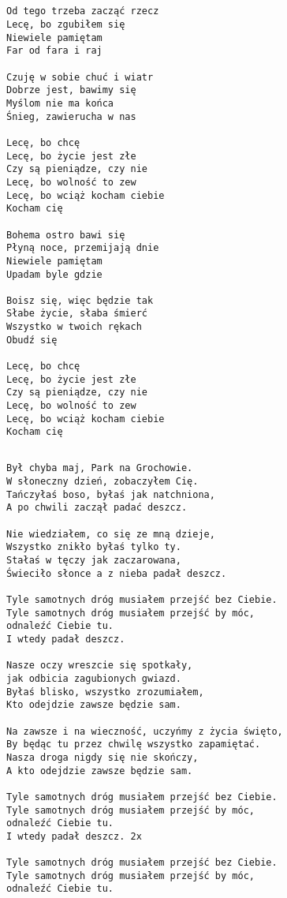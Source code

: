 \documentclass[12pt]{article}
\begin{document}
\subsection*{}
\begin{verbatim}
Od tego trzeba zacząć rzecz
Lecę, bo zgubiłem się
Niewiele pamiętam
Far od fara i raj

Czuję w sobie chuć i wiatr
Dobrze jest, bawimy się
Myślom nie ma końca
Śnieg, zawierucha w nas

Lecę, bo chcę
Lecę, bo życie jest złe
Czy są pieniądze, czy nie
Lecę, bo wolność to zew
Lecę, bo wciąż kocham ciebie
Kocham cię

Bohema ostro bawi się
Płyną noce, przemijają dnie
Niewiele pamiętam
Upadam byle gdzie

Boisz się, więc będzie tak
Słabe życie, słaba śmierć
Wszystko w twoich rękach
Obudź się

Lecę, bo chcę
Lecę, bo życie jest złe
Czy są pieniądze, czy nie
Lecę, bo wolność to zew
Lecę, bo wciąż kocham ciebie
Kocham cię
\end{verbatim}
\clearpage

\subsection*{}
\begin{verbatim}
Był chyba maj, Park na Grochowie.
W słoneczny dzień, zobaczyłem Cię.
Tańczyłaś boso, byłaś jak natchniona,
A po chwili zaczął padać deszcz.

Nie wiedziałem, co się ze mną dzieje,
Wszystko znikło byłaś tylko ty.
Stałaś w tęczy jak zaczarowana,
Świeciło słonce a z nieba padał deszcz.

Tyle samotnych dróg musiałem przejść bez Ciebie.
Tyle samotnych dróg musiałem przejść by móc,
odnaleźć Ciebie tu.
I wtedy padał deszcz.

Nasze oczy wreszcie się spotkały,
jak odbicia zagubionych gwiazd.
Byłaś blisko, wszystko zrozumiałem,
Kto odejdzie zawsze będzie sam.

Na zawsze i na wieczność, uczyńmy z życia święto,
By będąc tu przez chwilę wszystko zapamiętać.
Nasza droga nigdy się nie skończy,
A kto odejdzie zawsze będzie sam.

Tyle samotnych dróg musiałem przejść bez Ciebie.
Tyle samotnych dróg musiałem przejść by móc,
odnaleźć Ciebie tu.
I wtedy padał deszcz. 2x

Tyle samotnych dróg musiałem przejść bez Ciebie.
Tyle samotnych dróg musiałem przejść by móc,
odnaleźć Ciebie tu.
\end{verbatim}
\clearpage
\end{document}
